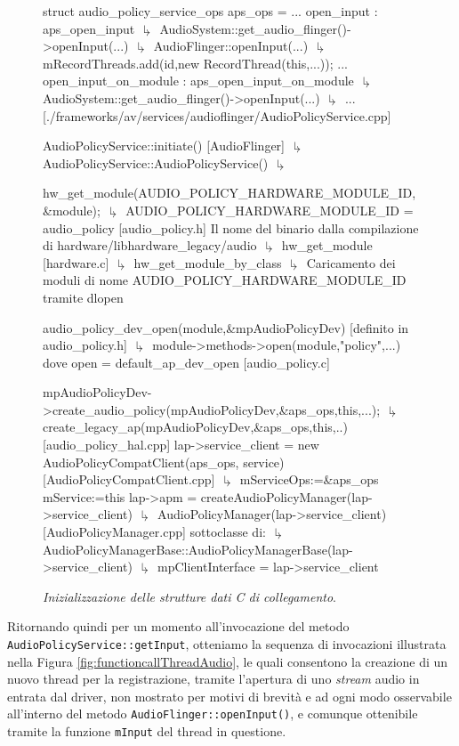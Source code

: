 \begin{figure}[thp]
\begin{cpp}[mathescape=true]
struct audio_policy_service_ops aps_ops = {
  ...
  open_input : aps_open_input
  $\drsh$ AudioSystem::get_audio_flinger()->openInput(...)
    $\drsh$ AudioFlinger::openInput(...)
      $\drsh$ mRecordThreads.add(id,new RecordThread(this,...));
  ...
  open_input_on_module : aps_open_input_on_module 
  $\drsh$ AudioSystem::get_audio_flinger()->openInput(...)
    $\drsh$ ...
} [./frameworks/av/services/audioflinger/AudioPolicyService.cpp]

AudioPolicyService::initiate() [AudioFlinger]
$\drsh$ AudioPolicyService::AudioPolicyService() 
  $\drsh$ {
      hw_get_module(AUDIO_POLICY_HARDWARE_MODULE_ID,&module);
      $\drsh$ AUDIO_POLICY_HARDWARE_MODULE_ID = audio_policy [audio_policy.h]
        Il nome del binario dalla compilazione di hardware/libhardware_legacy/audio
        $\drsh$ hw_get_module [hardware.c]
          $\drsh$  hw_get_module_by_class
            $\drsh$ Caricamento dei moduli di nome AUDIO_POLICY_HARDWARE_MODULE_ID tramite dlopen
  
       audio_policy_dev_open(module,&mpAudioPolicyDev) [definito in audio_policy.h]
       $\drsh$ module->methods->open(module,"policy",...) 
         dove open = default_ap_dev_open [audio_policy.c]
       
       mpAudioPolicyDev->create_audio_policy(mpAudioPolicyDev,&aps_ops,this,...);
         $\drsh$ create_legacy_ap(mpAudioPolicyDev,&aps_ops,this,..) [audio_policy_hal.cpp]
         {
           lap->service_client = new AudioPolicyCompatClient(aps_ops, service) [AudioPolicyCompatClient.cpp]
           $\drsh$ mServiceOps:=&aps_ops  mService:=this
           lap->apm = createAudioPolicyManager(lap->service_client) 
           $\drsh$ AudioPolicyManager(lap->service_client) [AudioPolicyManager.cpp] sottoclasse di:
             $\drsh$ AudioPolicyManagerBase::AudioPolicyManagerBase(lap->service_client)
               $\drsh$ mpClientInterface = lap->service_client
         }
  }
\end{cpp}
\caption{\textit{Inizializzazione delle strutture dati C di collegamento}.}
\label{fig:functioncallAudio}
\end{figure}

Ritornando quindi per un momento all'invocazione del metodo\\ \texttt{\small AudioPolicyService::getInput},
otteniamo la sequenza di invocazioni illustrata nella Figura \vref{fig:functioncallThreadAudio},
le quali consentono la creazione di un nuovo thread per la registrazione, tramite
l'apertura di uno \textit{stream} audio in entrata dal driver, non mostrato
per motivi di brevità e ad ogni modo osservabile all'interno del metodo \texttt{\small AudioFlinger::openInput()},
e comunque ottenibile tramite la funzione \texttt{\small mInput} del thread
in questione.

